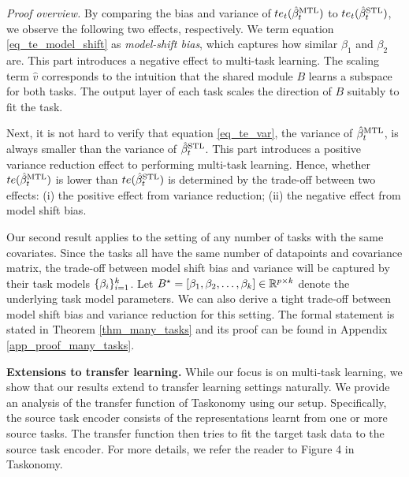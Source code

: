 \textit{Proof overview.} By comparing the bias and variance of $te_t(\hat{\beta}_t^{\text{MTL}})$ to $te_t(\hat{\beta}_t^{\text{STL}})$, we observe the following two effects, respectively.
We term equation \eqref{eq_te_model_shift} as \textit{model-shift bias}, which captures how similar $\beta_1$ and $\beta_2$ are.
This part introduces a negative effect to multi-task learning.
The scaling term $\hat{v}$ corresponds to the intuition that the shared module $B$ learns a subspace for both tasks.
The output layer of each task scales the direction of $B$ suitably to fit the task.

Next, it is not hard to verify that equation \eqref{eq_te_var}, the variance of $\hat{\beta}_t^{\text{MTL}}$, is always smaller than the variance of $\hat{\beta}_t^{\text{STL}}$.
This part introduces a positive variance reduction effect to performing multi-task learning.
Hence, whether $te(\hat{\beta}_t^{\text{MTL}})$ is lower than $te(\hat{\beta}_t^{\text{STL}})$ is determined by the trade-off between two effects:
(i) the positive effect from variance reduction;
(ii) the negative effect from model shift bias.

Our second result applies to the setting of any number of tasks with the same covariates.
Since the tasks all have the same number of datapoints and covariance matrix, the trade-off between model shift bias and variance will be captured by their task models $\{\beta_i\}_{i=1}^k$.
Let $B^{\star} = [\beta_1, \beta_2, \dots, \beta_k] \in\mathbb{R}^{p\times k}$ denote the underlying task model parameters.
We can also derive a tight trade-off between model shift bias and variance reduction for this setting.
The formal statement is stated in Theorem \ref{thm_many_tasks} and its proof can be found in Appendix \ref{app_proof_many_tasks}.

\textbf{Extensions to transfer learning.}
While our focus is on multi-task learning, we show that our results extend to transfer learning settings naturally.
We provide an analysis of the transfer function of Taskonomy \cite{ZSSGM18} using our setup.
Specifically, the source task encoder consists of the representations learnt from one or more source tasks.
The transfer function then tries to fit the target task data to the source task encoder.
For more details, we refer the reader to Figure 4 in Taskonomy.

